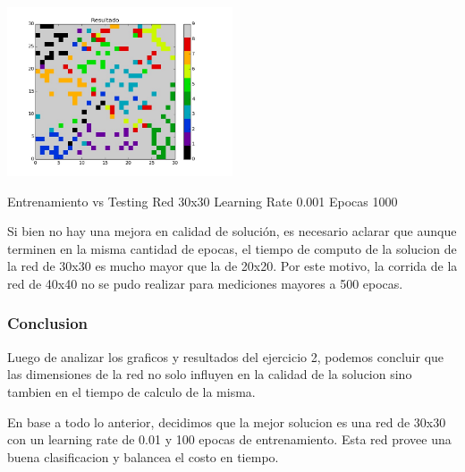 \includegraphics[width=0.5\textwidth]{img/ej2_test_M_30_lrate_001_epocas_1500}
{\footnotesize Entrenamiento vs Testing Red 30x30 Learning Rate 0.001 Epocas 1000\par}

Si bien no hay una mejora en calidad de soluci\'on, es necesario aclarar que aunque terminen en la misma cantidad de epocas, el tiempo de computo de la solucion de la red de 30x30 es mucho mayor que la de 20x20. Por este motivo, la corrida de la red de 40x40 no se pudo realizar para mediciones mayores a 500 epocas.

\subsubsection{Conclusion}

Luego de analizar los graficos y resultados del ejercicio 2, podemos concluir que las dimensiones de la red no solo influyen en la calidad de la solucion sino tambien en el tiempo de calculo de la misma. 

En base a todo lo anterior, decidimos que la mejor solucion es una red de 30x30 con un learning rate de 0.01 y 100 epocas de entrenamiento. Esta red provee una buena clasificacion y balancea el costo en tiempo.

